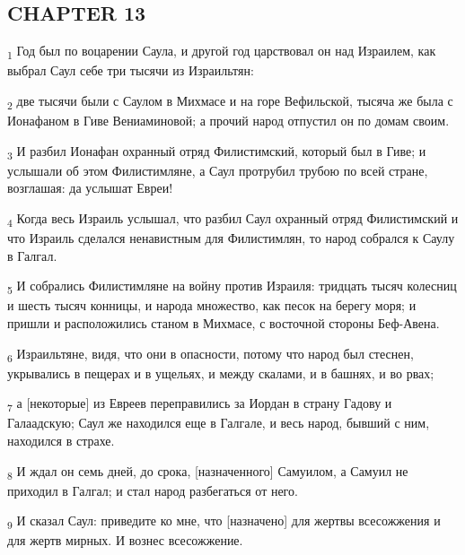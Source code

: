 \subsection{CHAPTER 13}
\begin{tcolorbox}
\textsubscript{1} Год был по воцарении Саула, и другой год царствовал он над Израилем, как выбрал Саул себе три тысячи из Израильтян:
\end{tcolorbox}
\begin{tcolorbox}
\textsubscript{2} две тысячи были с Саулом в Михмасе и на горе Вефильской, тысяча же была с Ионафаном в Гиве Вениаминовой; а прочий народ отпустил он по домам своим.
\end{tcolorbox}
\begin{tcolorbox}
\textsubscript{3} И разбил Ионафан охранный отряд Филистимский, который был в Гиве; и услышали об этом Филистимляне, а Саул протрубил трубою по всей стране, возглашая: да услышат Евреи!
\end{tcolorbox}
\begin{tcolorbox}
\textsubscript{4} Когда весь Израиль услышал, что разбил Саул охранный отряд Филистимский и что Израиль сделался ненавистным для Филистимлян, то народ собрался к Саулу в Галгал.
\end{tcolorbox}
\begin{tcolorbox}
\textsubscript{5} И собрались Филистимляне на войну против Израиля: тридцать тысяч колесниц и шесть тысяч конницы, и народа множество, как песок на берегу моря; и пришли и расположились станом в Михмасе, с восточной стороны Беф-Авена.
\end{tcolorbox}
\begin{tcolorbox}
\textsubscript{6} Израильтяне, видя, что они в опасности, потому что народ был стеснен, укрывались в пещерах и в ущельях, и между скалами, и в башнях, и во рвах;
\end{tcolorbox}
\begin{tcolorbox}
\textsubscript{7} а [некоторые] из Евреев переправились за Иордан в страну Гадову и Галаадскую; Саул же находился еще в Галгале, и весь народ, бывший с ним, находился в страхе.
\end{tcolorbox}
\begin{tcolorbox}
\textsubscript{8} И ждал он семь дней, до срока, [назначенного] Самуилом, а Самуил не приходил в Галгал; и стал народ разбегаться от него.
\end{tcolorbox}
\begin{tcolorbox}
\textsubscript{9} И сказал Саул: приведите ко мне, что [назначено] для жертвы всесожжения и для жертв мирных. И вознес всесожжение.
\end{tcolorbox}
